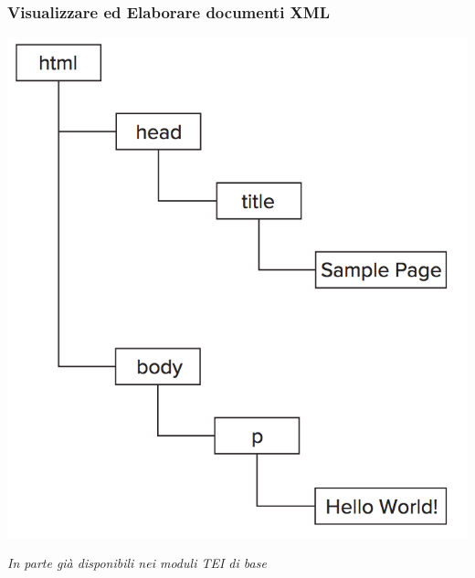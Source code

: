 \begin{frame}
    \frametitle{Visualizzare ed Elaborare documenti XML}
    \addtocounter{nframe}{1}
    
    \begin{center}
        \includegraphics[width=.9\textwidth]{imgs/XML-DOM.png}
    \end{center}
    \textit{In parte già disponibili nei moduli TEI di base}

\end{frame}


